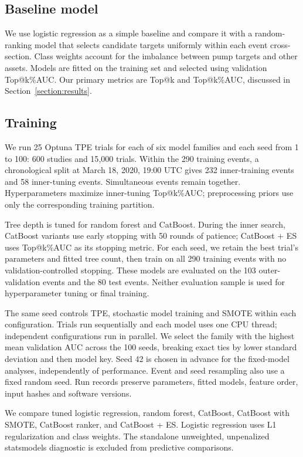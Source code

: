 \documentclass{ieeeaccess}
\begin{document}
\subsection{Baseline model}

We use logistic regression as a simple baseline and compare it with a random-ranking model that selects candidate targets uniformly within each event cross-section. Class weights account for the imbalance between pump targets and other assets. Models are fitted on the training set and selected using validation Top@k\%AUC. Our primary metrics are Top@k and Top@k\%AUC, discussed in Section~\ref{section:results}.

\subsection{Training}
We run 25 Optuna TPE trials for each of six model families and each seed from 1 to 100: 600 studies and 15{,}000 trials. Within the 290 training events, a chronological split at March 18, 2020, 19:00 UTC gives 232 inner-training events and 58 inner-tuning events. Simultaneous events remain together. Hyperparameters maximize inner-tuning Top@k\%AUC; preprocessing priors use only the corresponding training partition.

Tree depth is tuned for random forest and CatBoost. During the inner search, CatBoost variants use early stopping with 50 rounds of patience; CatBoost + ES uses Top@k\%AUC as its stopping metric. For each seed, we retain the best trial's parameters and fitted tree count, then train on all 290 training events with no validation-controlled stopping. These models are evaluated on the 103 outer-validation events and the 80 test events. Neither evaluation sample is used for hyperparameter tuning or final training.

The same seed controls TPE, stochastic model training and SMOTE within each configuration. Trials run sequentially and each model uses one CPU thread; independent configurations run in parallel. We select the family with the highest mean validation AUC across the 100 seeds, breaking exact ties by lower standard deviation and then model key. Seed 42 is chosen in advance for the fixed-model analyses, independently of performance. Event and seed resampling also use a fixed random seed. Run records preserve parameters, fitted models, feature order, input hashes and software versions.

We compare tuned logistic regression, random forest, CatBoost, CatBoost with SMOTE, CatBoost ranker, and CatBoost + ES. Logistic regression uses L1 regularization and class weights. The standalone unweighted, unpenalized statsmodels diagnostic is excluded from predictive comparisons.
\end{document}
